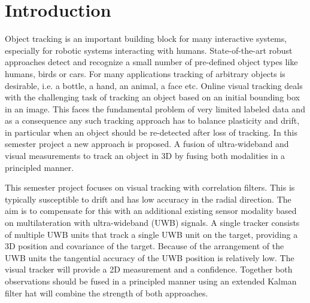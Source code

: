 
\setcounter{chapter}{0}

\chapter{Introduction}

Object tracking is an important building block for	many interactive systems, especially for robotic systems interacting with humans. State-of-the-art robust approaches detect and recognize a small number of pre-defined	object types like humans,	birds	or cars. For	many applications tracking of arbitrary objects	is desirable, i.e. a bottle,	a hand, an animal, a face etc. Online visual tracking deals with the	challenging	task of tracking an object based on an initial bounding box in an image. This faces the fundamental problem of very limited labeled data and as a consequence any such tracking approach has to balance plasticity and drift, in particular when an object	should	be re-detected after loss of tracking. In this semester project a new approach is proposed. A fusion of ultra-wideband and visual	measurements to track an object in 3D by fusing both modalities in a principled manner.

This semester project focuses on visual tracking with correlation filters. This is typically susceptible to drift and has low accuracy in the radial direction. The aim is to compensate for this with an additional existing sensor modality based on multilateration with ultra-wideband (UWB) signals. A single tracker consists of multiple UWB units that track a single UWB unit on the target, providing a 3D position and covariance of the target. Because of the arrangement of the UWB units the tangential accuracy of the UWB position is relatively low. The visual tracker will provide a 2D measurement and a confidence. Together both observations should be fused in a principled manner using an extended Kalman filter hat will combine the strength of both approaches.